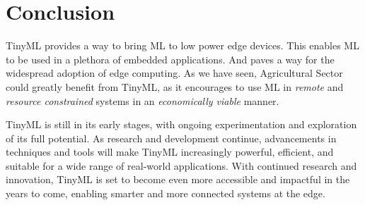 \documentclass[../main]{subfiles}
\begin{document}
\chapter{Conclusion} \label{chp:}


TinyML provides a way to bring ML to low power edge devices. This enables ML to
be used in a plethora of embedded applications. And paves a way for the
widespread adoption of edge computing. As we have seen, Agricultural Sector could
greatly benefit from TinyML, as it encourages to use ML in \emph{remote} and
\emph{resource constrained} systems in an \emph{economically viable} manner.

TinyML is still in its early stages, with ongoing experimentation and
exploration of its full potential. As research and development continue,
advancements in techniques and tools will make TinyML increasingly powerful,
efficient, and suitable for a wide range of real-world applications. With
continued research and innovation, TinyML is set to become even more accessible
and impactful in the years to come, enabling smarter and more connected systems
at the edge.
\end{document}
